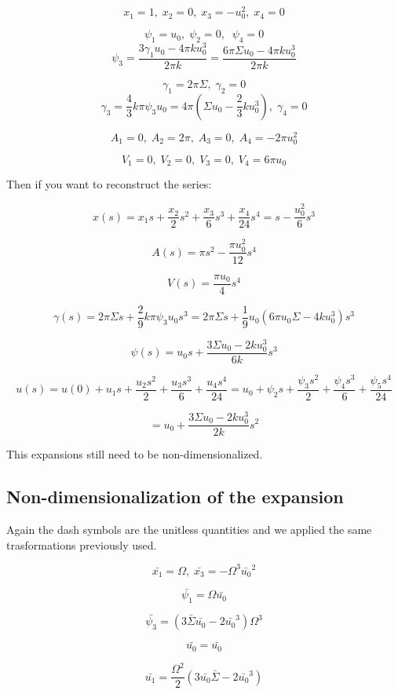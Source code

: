\documentclass[12pt]{article}
\begin{document}
$$
x_1 = 1 ,\; x_2 = 0 ,\; x_3 = - u_0^2 ,\; x_4 = 0
$$


$$
\psi_1 = u_0  ,\; \psi_2 = 0 ,\; \; \psi_4 = 0
$$
$$
\psi_3 = \frac{3\gamma_1 u_0 - 4 \pi k u_0^3}{2 \pi k } = \frac{6 \pi \Sigma u_0 - 4 \pi k u_0^3}{2 \pi k }
$$


$$
\gamma_1 = 2 \pi \Sigma ,\; \gamma_2 = 0 
$$
$$
\gamma_3 = \frac{4}{3} k \pi \psi_3 u_0 = 4 \pi (\Sigma u_0 - \frac{2}{3} k u_0^3) ,\; \gamma_4 = 0
$$



$$
A_1 = 0 ,\; A_2 =  2 \pi ,\; A_3 = 0 ,\; A_4 = - 2 \pi u_0^2
$$

$$
V_1 = 0 ,\; V_2 = 0 ,\; V_3 = 0 ,\; V_4 = 6 \pi u_0
$$


Then if you want to reconstruct the series:


$$
x(s)=x_1 s+\frac{x_2}{2}s^2+\frac{x_3}{6}s^3+\frac{x_4}{24} s^4 =s-\frac{u_0^2}{6}s^3 
$$

$$
A(s) = \pi s^2 - \frac{\pi u_0^2}{12}s^4
$$


$$
V(s) = \frac{\pi u_0}{4}s^4
$$


$$
\gamma(s) = 2 \pi \Sigma s + \frac{2}{9} k \pi \psi_3 u_0 s^3 = 2 \pi \Sigma s + \frac{1}{9}  u_0 (6 \pi u_0 \Sigma - 4 k u_0^3)s^3
$$

$$
\psi(s)=u_0s + \frac{3  \Sigma u_0 - 2  k u_0^3}{6 k }s^3
$$

$$
u(s)=u(0) + u_1s + \frac{u_2 s^2}{2} + \frac{u_3 s^3}{6} + \frac{u_4 s^4}{24} = u_0 + \psi_2 s + \frac{\psi_3 s^2}{2} + \frac{\psi_4 s^3}{6} + \frac{\psi_5 s^4}{24}
$$

$$
= u_0  + \frac{3  \Sigma u_0 - 2  k u_0^3}{2 k }s^2
$$

This expansions still need to be non-dimensionalized.

\subsection{Non-dimensionalization of the expansion}
Again the dash symbols are the unitless quantities and we applied the same trasformations previously used.


$$
\bar{x_1} = \Omega ,\;  \bar{x_3} = - \Omega^3 \bar{u_0}^2 
$$

$$
\bar{\psi_1}  = \Omega \bar{u_0}
$$

$$
\bar{\psi_3} = (3\bar{\Sigma} \bar{u_0} - 2 \bar{u_0}^3)\Omega^3
$$

$$
\bar{u_0} = \bar{u_0} 
$$

$$
\bar{u_1} = \frac{\Omega^2}{2} (3\bar{u_0} \bar{\Sigma} - 2 \bar{u_0}^3) 
$$
\end{document}
